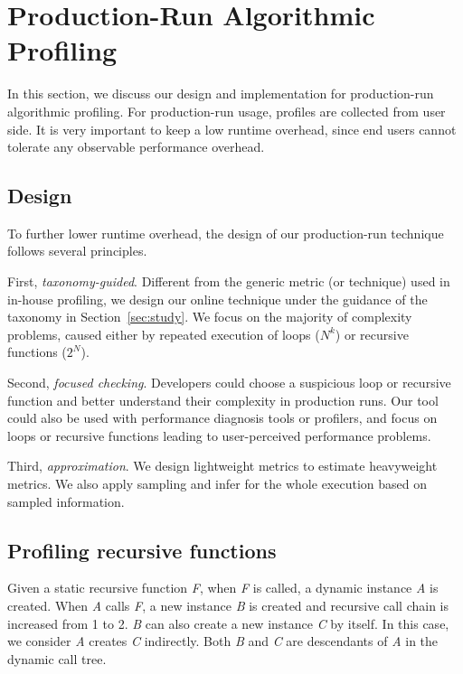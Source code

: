 \section{Production-Run Algorithmic Profiling}
\label{sec:online}

In this section, we discuss our design and 
implementation for production-run algorithmic profiling. 
For production-run usage, profiles are collected from user side.
It is very important to keep a low runtime overhead, since
end users cannot tolerate any observable performance overhead. 


\subsection{Design}

To further lower runtime overhead,
the design of our production-run technique follows several principles. 

First, \textit{taxonomy-guided}. 
Different from the generic metric (or technique) used in in-house profiling,
we design our online technique 
under the guidance of the taxonomy in Section~\ref{sec:study}.
We focus on the majority of complexity problems, 
caused either by repeated execution of loops ($N^k$)
or recursive functions ($2^N$).  

Second, \textit{focused checking}.
Developers could choose a suspicious loop or recursive function 
and better understand their complexity in production runs.
Our tool could also be used with performance diagnosis tools or profilers,
and focus on loops or recursive functions leading 
to user-perceived performance problems.

Third, \textit{approximation}. 
We design lightweight metrics to estimate heavyweight metrics.
We also apply sampling and infer 
for the whole execution based on sampled information. 

\subsection{Profiling recursive functions}
Given a static recursive function \textit{F},
when \textit{F} is called, 
a dynamic instance \textit{A} is created.
When \textit{A} calls \textit{F}, 
a new instance \textit{B} is created 
and recursive call chain is increased from 1 to 2. 
\textit{B} can also create a new instance \textit{C} by itself.
In this case, we consider \textit{A} creates \textit{C} indirectly.
Both \textit{B} and \textit{C} are 
descendants of \textit{A} in the dynamic call tree. 


